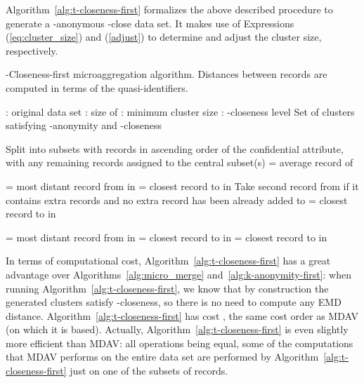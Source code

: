 \documentclass[10pt,journal,compsoc]{IEEEtran}
\theoremstyle{definition}
\theoremstyle{plain}
\begin{document}
Algorithm~\ref{alg:t-closeness-first} formalizes 
the above described procedure to generate a -anonymous -close
data set.
It makes use of Expressions (\ref{eq:cluster_size}) and (\ref{adjust})
 to determine and adjust the cluster size, respectively.
 
 \begin{algorithm}
 	\protect\caption{\label{alg:t-closeness-first}-Closeness-first microaggregation algorithm. 
Distances between records are computed
 		in terms of the quasi-identifiers.}
 	
 	\begin{algorithmic}[0]
 		
 	 : original data set
 	\State \hspace{1.11cm}: size of 
 	\State \hspace{1.11cm}: minimum cluster size
 	\State \hspace{1.11cm}: -closeness level
 	 Set of clusters satisfying -anonymity and -closeness
 	\vspace{0.3cm}
\State 
\State 
 	\State 
 	
\State Split  into  subsets with 
 	 records 
 	in ascending order of the confidential attribute, with any remaining 
 	 records 
 	assigned to the central subset(s)
 	\While{}
\State  = average record of 
 		
 		\State  = most distant record from  in 
 		\State 
 		\For{}
 			\State  = closest record to  in 
 			\State 
 			\State 
 			\State 
\LineComment Take second record from  if it contains extra records and no extra record has been already added to 
 				\State  = closest record to  in 
 				\State 
 				\State 
 				\State 
 			\EndIf
 		\EndFor
 		\State 
 		
 		\If{}
 			\State  = most distant record from  in 
 			\State 
 			\For{}
\State  = closest record to  in 
 				\State 
 				\State 
 				\State 
\State  = closest record to  in 
 					\State 
 					\State 
 					\State 					
 				\EndIf	
 			\EndFor
 			\State 
 		\EndIf
 	\EndWhile
 	\end{algorithmic}
 	
 \end{algorithm}
 
In terms of computational cost, Algorithm~\ref{alg:t-closeness-first} has a great advantage over 
 Algorithms~\ref{alg:micro_merge} and~\ref{alg:k-anonymity-first}: when running
 Algorithm~\ref{alg:t-closeness-first}, we know that by
construction the generated clusters satisfy -closeness, so there is no need to compute any EMD distance. Algorithm~\ref{alg:t-closeness-first}
 has cost , the same cost order as MDAV (on which 
it is based). Actually,
 Algorithm~\ref{alg:t-closeness-first} is even slightly more efficient 
than MDAV: all operations being
 equal, some of the computations that MDAV performs on the entire data set are performed by 
 Algorithm~\ref{alg:t-closeness-first} just on one of the 
subsets of  records.
\end{document}
